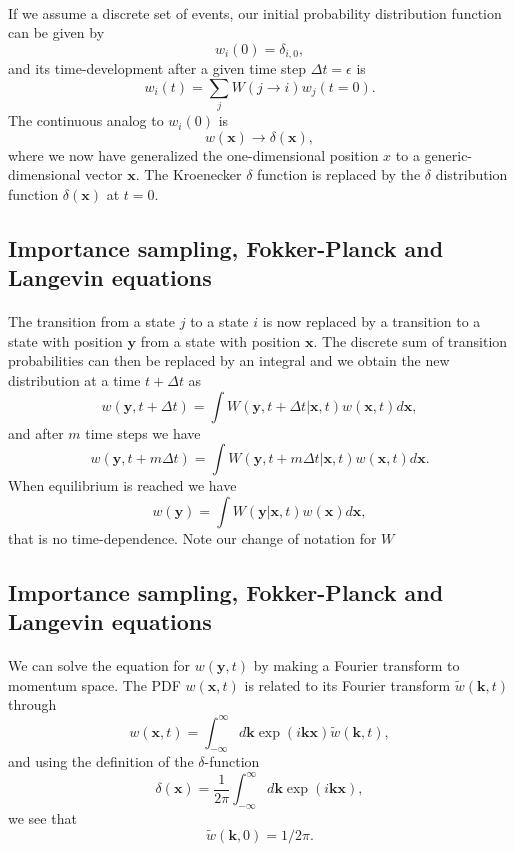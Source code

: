 \documentclass[%
twoside,                 %
final,                   %
10pt]{article}
\begin{document}
{{{{{{%
\paragraph{}
If we assume a discrete set of events,
our initial probability
distribution function can be  given by 
\[
   w_i(0) = \delta_{i,0},
\]
and its time-development after a given time step $\Delta t=\epsilon$ is
\[ 
   w_i(t) = \sum_{j}W(j\rightarrow i)w_j(t=0).
\] 
The continuous analog to $w_i(0)$ is
\[
   w(\mathbf{x})\rightarrow \delta(\mathbf{x}),
\]
where we now have generalized the one-dimensional position $x$ to a generic-dimensional  
vector $\mathbf{x}$. The Kroenecker $\delta$ function is replaced by the $\delta$ distribution
function $\delta(\mathbf{x})$ at  $t=0$.




\subsection{Importance sampling, Fokker-Planck and Langevin equations}

\paragraph{}
The transition from a state $j$ to a state $i$ is now replaced by a transition
to a state with position $\mathbf{y}$ from a state with position $\mathbf{x}$. 
The discrete sum of transition probabilities can then be replaced by an integral
and we obtain the new distribution at a time $t+\Delta t$ as 
\[
   w(\mathbf{y},t+\Delta t)= \int W(\mathbf{y},t+\Delta t| \mathbf{x},t)w(\mathbf{x},t)d\mathbf{x},
\]
and after $m$ time steps we have
\[
   w(\mathbf{y},t+m\Delta t)= \int W(\mathbf{y},t+m\Delta t| \mathbf{x},t)w(\mathbf{x},t)d\mathbf{x}.
\]
When equilibrium is reached we have
\[
   w(\mathbf{y})= \int W(\mathbf{y}|\mathbf{x}, t)w(\mathbf{x})d\mathbf{x},
\]
that is no time-dependence. Note our change of notation for $W$




\subsection{Importance sampling, Fokker-Planck and Langevin equations}

\paragraph{}
We can solve the equation for $w(\mathbf{y},t)$ by making a Fourier transform to
momentum space. 
The PDF $w(\mathbf{x},t)$ is related to its Fourier transform
$\tilde{w}(\mathbf{k},t)$ through
\[
   w(\mathbf{x},t) = \int_{-\infty}^{\infty}d\mathbf{k} \exp{(i\mathbf{kx})}\tilde{w}(\mathbf{k},t),
\]
and using the definition of the 
$\delta$-function 
\[
   \delta(\mathbf{x}) = \frac{1}{2\pi} \int_{-\infty}^{\infty}d\mathbf{k} \exp{(i\mathbf{kx})},
\]
 we see that
\[
   \tilde{w}(\mathbf{k},0)=1/2\pi.
\]




}}}}}}
\end{document}
